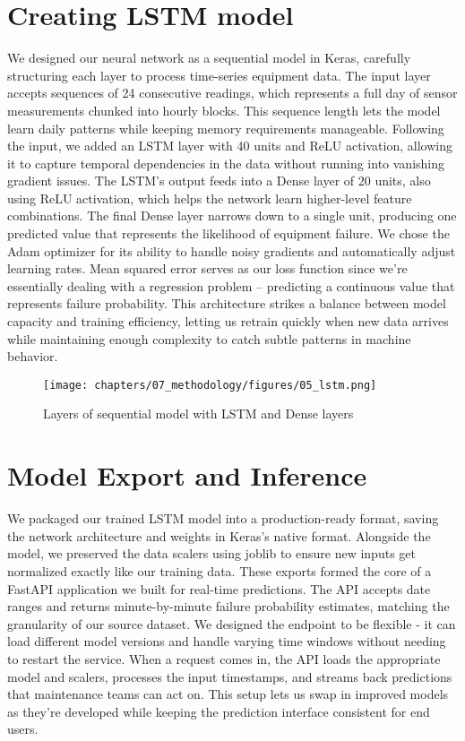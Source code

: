 \section{Creating LSTM model}
We designed our neural network as a sequential model in Keras, carefully structuring each layer to process time-series equipment data. The input layer accepts sequences of 24 consecutive readings, which represents a full day of sensor measurements chunked into hourly blocks. This sequence length lets the model learn daily patterns while keeping memory requirements manageable. Following the input, we added an LSTM layer with 40 units and ReLU activation, allowing it to capture temporal dependencies in the data without running into vanishing gradient issues. The LSTM's output feeds into a Dense layer of 20 units, also using ReLU activation, which helps the network learn higher-level feature combinations. The final Dense layer narrows down to a single unit, producing one predicted value that represents the likelihood of equipment failure. We chose the Adam optimizer for its ability to handle noisy gradients and automatically adjust learning rates. Mean squared error serves as our loss function since we're essentially dealing with a regression problem – predicting a continuous value that represents failure probability. This architecture strikes a balance between model capacity and training efficiency, letting us retrain quickly when new data arrives while maintaining enough complexity to catch subtle patterns in machine behavior.

\begin{figure}[H]
    \centering
    \texttt{[image: chapters/07\_methodology/figures/05\_lstm.png]}
    \caption{Layers of sequential model with LSTM and Dense layers}
\end{figure}

\section{Model Export and Inference}
We packaged our trained LSTM model into a production-ready format, saving the network architecture and weights in Keras's native format. Alongside the model, we preserved the data scalers using joblib to ensure new inputs get normalized exactly like our training data. These exports formed the core of a FastAPI application we built for real-time predictions. The API accepts date ranges and returns minute-by-minute failure probability estimates, matching the granularity of our source dataset. We designed the endpoint to be flexible - it can load different model versions and handle varying time windows without needing to restart the service. When a request comes in, the API loads the appropriate model and scalers, processes the input timestamps, and streams back predictions that maintenance teams can act on. This setup lets us swap in improved models as they're developed while keeping the prediction interface consistent for end users.

